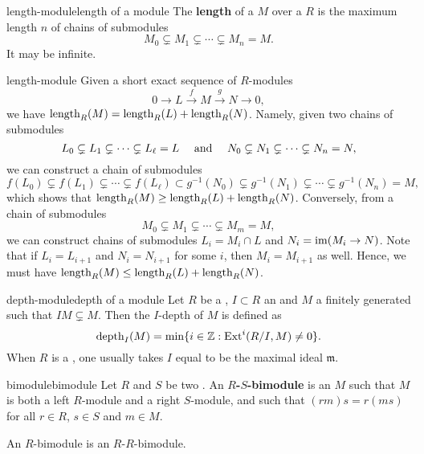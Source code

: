 \begin{topic}{length-module}{length of a module}
    The \textbf{length} of a  $M$ over a  $R$ is the maximum length $n$ of chains of submodules
    \[ M_0 \subsetneq M_1 \subsetneq \cdots \subsetneq M_n = M . \]
    It may be infinite.
\end{topic}

\begin{example}{length-module}
    Given a short exact sequence of $R$-modules
    \[ 0 \to L \xrightarrow{f} M \xrightarrow{g} N \to 0 , \]
    we have $\textup{length}_R(M) = \textup{length}_R(L) + \textup{length}_R(N)$. Namely, given two chains of submodules
    \[ L_0 \subsetneq L_1 \subsetneq \cdots \subsetneq L_\ell = L \quad \textup{ and } \quad N_0 \subsetneq N_1 \subsetneq \cdots \subsetneq N_n = N , \]
    we can construct a chain of submodules
    \[ f(L_0) \subsetneq f(L_1) \subsetneq \cdots \subsetneq f(L_\ell) \subset g^{-1}(N_0) \subsetneq g^{-1}(N_1) \subsetneq \cdots \subsetneq g^{-1}(N_n) = M , \]
    which shows that $\textup{length}_R(M) \ge \textup{length}_R(L) + \textup{length}_R(N)$. Conversely, from a chain of submodules
    \[ M_0 \subsetneq M_1 \subsetneq \cdots \subsetneq M_m = M , \]
    we can construct chains of submodules $L_i = M_i \cap L$ and $N_i = \operatorname{im}(M_i \to N)$. Note that if $L_i = L_{i + 1}$ and $N_i = N_{i + 1}$ for some $i$, then $M_i = M_{i + 1}$ as well. Hence, we must have $\textup{length}_R(M) \le \textup{length}_R(L) + \textup{length}_R(N)$.
\end{example}

\begin{topic}{depth-module}{depth of a module}
    Let $R$ be a , $I \subset R$ an  and $M$ a finitely generated  such that $IM \subsetneq M$. Then the $I$-depth of $M$ is defined as
    \[ \textup{depth}_I(M) = \min \{ i \in \mathbb{Z} : \textup{Ext}^i(R/I, M) \ne 0 \} . \]
    When $R$ is a , one usually takes $I$ equal to be the maximal ideal $\mathfrak{m}$.
\end{topic}

\begin{topic}{bimodule}{bimodule}
    Let $R$ and $S$ be two . An \textbf{$R$-$S$-bimodule} is an  $M$ such that $M$ is both a left $R$-module and a right $S$-module, and such that $(rm)s = r(ms)$ for all $r \in R$, $s \in S$ and $m \in M$.
    
    An $R$-bimodule is an $R$-$R$-bimodule.
\end{topic}

